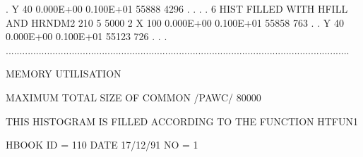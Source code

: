 \begin{Listing}
 .                                                                        Y    40   0.000E+00   0.100E+01       55888   4296 .
 .                                                                                                                           .
 .   6  HIST FILLED WITH HFILL AND HRNDM2            210   5     5000  2  X   100   0.000E+00   0.100E+01       55858    763 .
 .                                                                        Y    40   0.000E+00   0.100E+01       55123    726 .
 .                                                                                                                           .
 .............................................................................................................................

 MEMORY UTILISATION

      MAXIMUM TOTAL SIZE OF COMMON /PAWC/            80000
 
 THIS HISTOGRAM IS FILLED ACCORDING TO THE FUNCTION HTFUN1                       
 
 HBOOK     ID =       110                                        DATE  17/12/91              NO =   1
 

\end{Listing}
